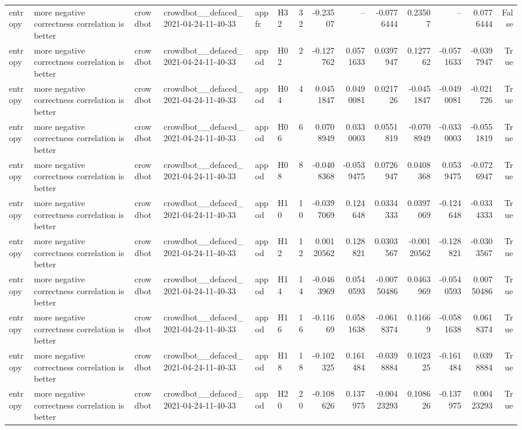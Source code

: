 \begin{longtable}{llllllrrrrrrrr}
entropy & more negative correctness correlation is better & crowdbot & crowdbot\_\_defaced\_2021-04-24-11-40-33 & appfr & H32 & 32 & -0.23507 & -- & -0.0776444 & 0.23507 & -- & 0.0776444 & False \\
entropy & more negative correctness correlation is better & crowdbot & crowdbot\_\_defaced\_2021-04-24-11-40-33 & appod & H02 & 2 & -0.127762 & 0.0571633 & 0.0397947 & 0.127762 & -0.0571633 & -0.0397947 & True \\
entropy & more negative correctness correlation is better & crowdbot & crowdbot\_\_defaced\_2021-04-24-11-40-33 & appod & H04 & 4 & 0.0451847 & 0.0490081 & 0.021726 & -0.0451847 & -0.0490081 & -0.021726 & True \\
entropy & more negative correctness correlation is better & crowdbot & crowdbot\_\_defaced\_2021-04-24-11-40-33 & appod & H06 & 6 & 0.0708949 & 0.0330003 & 0.0551819 & -0.0708949 & -0.0330003 & -0.0551819 & True \\
entropy & more negative correctness correlation is better & crowdbot & crowdbot\_\_defaced\_2021-04-24-11-40-33 & appod & H08 & 8 & -0.0408368 & -0.0539475 & 0.0726947 & 0.0408368 & 0.0539475 & -0.0726947 & True \\
entropy & more negative correctness correlation is better & crowdbot & crowdbot\_\_defaced\_2021-04-24-11-40-33 & appod & H10 & 10 & -0.0397069 & 0.124648 & 0.0334333 & 0.0397069 & -0.124648 & -0.0334333 & True \\
entropy & more negative correctness correlation is better & crowdbot & crowdbot\_\_defaced\_2021-04-24-11-40-33 & appod & H12 & 12 & 0.00120562 & 0.128821 & 0.0303567 & -0.00120562 & -0.128821 & -0.0303567 & True \\
entropy & more negative correctness correlation is better & crowdbot & crowdbot\_\_defaced\_2021-04-24-11-40-33 & appod & H14 & 14 & -0.0463969 & 0.0540593 & -0.00750486 & 0.0463969 & -0.0540593 & 0.00750486 & True \\
entropy & more negative correctness correlation is better & crowdbot & crowdbot\_\_defaced\_2021-04-24-11-40-33 & appod & H16 & 16 & -0.11669 & 0.0581638 & -0.0618374 & 0.11669 & -0.0581638 & 0.0618374 & True \\
entropy & more negative correctness correlation is better & crowdbot & crowdbot\_\_defaced\_2021-04-24-11-40-33 & appod & H18 & 18 & -0.102325 & 0.161484 & -0.0398884 & 0.102325 & -0.161484 & 0.0398884 & True \\
entropy & more negative correctness correlation is better & crowdbot & crowdbot\_\_defaced\_2021-04-24-11-40-33 & appod & H20 & 20 & -0.108626 & 0.137975 & -0.00423293 & 0.108626 & -0.137975 & 0.00423293 & True \\

\end{longtable}
